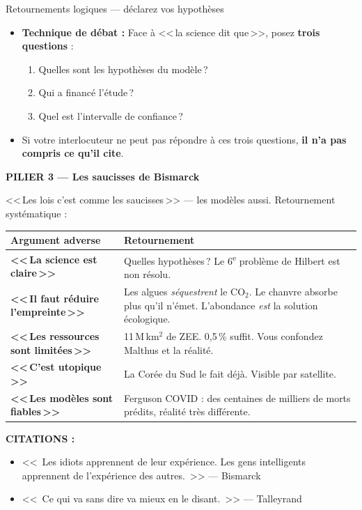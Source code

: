 \documentclass[a4paper,11pt]{article}
\begin{document}
\begin{ficheorange}{Retournements logiques --- d\'{e}clarez vos hypoth\`{e}ses}
\begin{itemize}[nosep, label=\color{ModeOrange}$\blacktriangleright$]
  \item \textbf{Technique de d\'{e}bat :} Face \`{a} <<\,la science dit que\,>>, posez \textbf{trois questions} :
  \begin{enumerate}[nosep, label=\textbf{\arabic*.}]
    \item Quelles sont les hypoth\`{e}ses du mod\`{e}le\,?
    \item Qui a financ\'{e} l'\'{e}tude\,?
    \item Quel est l'intervalle de confiance\,?
  \end{enumerate}
  \item Si votre interlocuteur ne peut pas r\'{e}pondre \`{a} ces trois questions, \textbf{il n'a pas compris ce qu'il cite}.
\end{itemize}

\vspace{0.3cm}
\textbf{\color{ModeOrange}PILIER 3 --- Les saucisses de Bismarck}

<<\,Les lois c'est comme les saucisses\,>> --- les mod\`{e}les aussi. Retournement syst\'{e}matique :

\begin{center}
\begin{tabular}{>{\bfseries}l p{9cm}}
\toprule
\textbf{Argument adverse} & \textbf{Retournement} \\
\midrule
<<\,La science est claire\,>> & Quelles hypoth\`{e}ses\,? Le 6\textsuperscript{e} probl\`{e}me de Hilbert est non r\'{e}solu. \\
<<\,Il faut r\'{e}duire l'empreinte\,>> & Les algues \emph{s\'{e}questrent} le CO$_2$. Le chanvre absorbe plus qu'il n'\'{e}met. L'abondance \emph{est} la solution \'{e}cologique. \\
<<\,Les ressources sont limit\'{e}es\,>> & 11\,M\,km$^2$ de ZEE. 0{,}5\,\% suffit. Vous confondez Malthus et la r\'{e}alit\'{e}. \\
<<\,C'est utopique\,>> & La Cor\'{e}e du Sud le fait d\'{e}j\`{a}. Visible par satellite. \\
<<\,Les mod\`{e}les sont fiables\,>> & Ferguson COVID : des centaines de milliers de morts pr\'{e}dits, r\'{e}alit\'{e} tr\`{e}s diff\'{e}rente. \\
\bottomrule
\end{tabular}
\end{center}

\vspace{0.3cm}
\textbf{CITATIONS :}
\begin{itemize}[nosep, font=\itshape]
  \item <<~Les idiots apprennent de leur exp\'{e}rience. Les gens intelligents apprennent de l'exp\'{e}rience des autres.~>> --- Bismarck
  \item <<~Ce qui va sans dire va mieux en le disant.~>> --- Talleyrand
\end{itemize}


\end{ficheorange}
\end{document}
